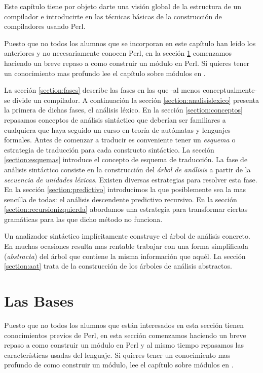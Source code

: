 \label{chapter:introcomp}
Este capítulo tiene por objeto darte una visión global de la 
estructura de un compilador e introducirte en las técnicas básicas
de la construcción de compiladores usando Perl.

Puesto que no todos los alumnos que se incorporan en este capítulo 
han leído los anteriores y no necesariamente conocen Perl, en la sección
\ref{section:lasbases}
comenzamos haciendo un breve repaso a como construir un módulo en Perl.
Si quieres tener un conocimiento mas profundo
lee el capítulo sobre módulos en 
. 

La sección 
\ref{section:fases}
describe las fases en las que -al menos conceptualmente-
se divide un compilador.
A continuación la sección 
\ref{section:analisislexico}
presenta la primera de dichas fases, el análisis léxico.
En la sección 
\ref{section:conceptos}
repasamos conceptos de análisis sintáctico 
que deberían ser familiares a cualquiera que haya 
seguido un curso en teoría de autómatas 
y lenguajes formales.
Antes de comenzar a traducir es conveniente tener un \emph{esquema} o estrategia
de traducción para cada constructo sintáctico. 
La sección 
\ref{section:esquemas}
introduce el concepto de esquema de traducción.
La fase de análisis sintáctico consiste en la construcción
del \emph{árbol de análisis} a partir de la \emph{secuencia de unidades léxicas}. 
Existen diversas estrategias para resolver esta fase.
En la sección 
\ref{section:predictivo}
introducimos la que posiblemente sea la mas sencilla de todas: el análisis
descendente predictivo recursivo.
En la sección
\ref{section:recursionizquierda}
abordamos una estrategia para transformar ciertas
gramáticas para las que dicho método no funciona.

Un analizador sintáctico implícitamente construye 
el árbol de análisis concreto. En muchas ocasiones
resulta mas rentable trabajar con una forma simplificada
(\emph{abstracta}) del árbol que contiene la misma información 
que aquél. La sección 
\ref{section:aat} trata de la construcción de los 
árboles de análisis abstractos.

\section{Las Bases}
\label{section:lasbases}
Puesto que no todos los alumnos que están interesados en esta sección
tienen conocimientos previos de Perl, en esta sección
comenzamos haciendo un breve repaso a como construir un módulo en Perl
y al mismo tiempo repasamos las características usadas del lenguaje.
Si quieres tener un conocimiento mas profundo
de como construir un módulo, lee el capítulo
sobre módulos en .

